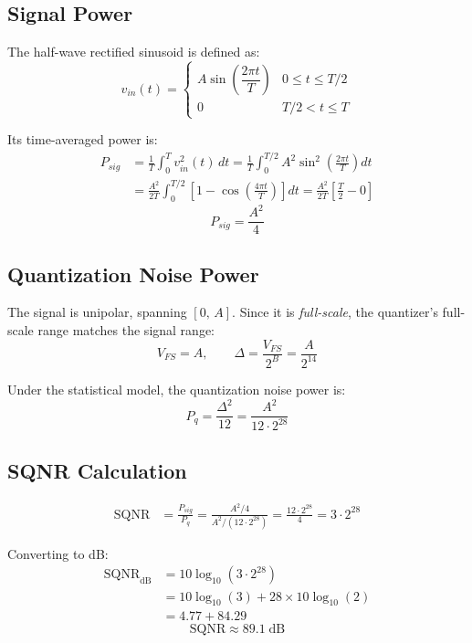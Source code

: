 \documentclass{article}
\begin{document}
  \subsection{Signal Power}

  The half-wave rectified sinusoid is defined as:
  \[
      v_{in}(t) = \begin{cases}
          A\sin\!\left(\dfrac{2\pi t}{T}\right) & 0 \leq t \leq T/2 \\[4pt]
          0 & T/2 < t \leq T
      \end{cases}
  \]

  Its time-averaged power is:
  \begin{align}
      P_{sig} &= \frac{1}{T}\int_0^{T} v_{in}^2(t)\,dt
      = \frac{1}{T}\int_0^{T/2} A^2 \sin^2\!\left(\frac{2\pi t}{T}\right)dt \nonumber \\[6pt]
      &= \frac{A^2}{2T}\int_0^{T/2}\left[1 - \cos\!\left(\frac{4\pi t}{T}\right)\right]dt
      = \frac{A^2}{2T}\left[\frac{T}{2} - 0\right]
  \end{align}
  \[
      \boxed{P_{sig} = \frac{A^2}{4}}
  \]

  \subsection{Quantization Noise Power}

  The signal is unipolar, spanning $[0,\,A]$. Since it is \emph{full-scale}, the quantizer's full-scale range matches the signal
   range:
  \[
      V_{FS} = A, \qquad \Delta = \frac{V_{FS}}{2^B} = \frac{A}{2^{14}}
  \]

  Under the statistical model, the quantization noise power is:
  \[
      P_q = \frac{\Delta^2}{12} = \frac{A^2}{12 \cdot 2^{28}}
  \]

  \subsection{SQNR Calculation}

  \begin{align}
      \text{SQNR} &= \frac{P_{sig}}{P_q}
      = \frac{A^2/4}{A^2/(12 \cdot 2^{28})}
      = \frac{12 \cdot 2^{28}}{4}
      = 3 \cdot 2^{28}
  \end{align}

  Converting to dB:
  \begin{align}
      \text{SQNR}_{\text{dB}} &= 10\log_{10}\!\left(3 \cdot 2^{28}\right) \nonumber \\
      &= 10\log_{10}(3) + 28 \times 10\log_{10}(2) \nonumber \\
      &= 4.77 + 84.29
  \end{align}
  \[
      \boxed{\text{SQNR} \approx 89.1\;\text{dB}}
  \]
\end{document}
